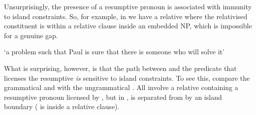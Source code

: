 \documentclass[output=paper,nonflat,draftmode]{./langsci/langscibook}
\begin{document}
Unsurprisingly, the presence of a resumptive pronoun is associated with immunity to island
constraints. So, for example, in  we have a relative where the relativised constituent is within a relative clause inside an embedded NP, which is 
impossible for a genuine gap.
\begin{exe}
  \label{x:rc-78}
  \glt `a problem such that Paul is sure that there is someone  who will solve it'
\end{exe}
What is surprising, however, is that the path between  and the predicate that
licenses the resumptive \emph{is} sensitive to island constraints. To see this, compare
the grammatical  and  with the ungrammatical
. All involve a  relative containing a resumptive pronoun
licensed by , but in ,
 is separated from  by an island boundary ( is inside a relative clause).
\begin{exe}
  \label{x:rc-171}
\end{exe}
\end{document}
